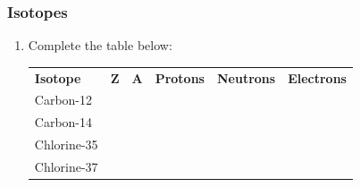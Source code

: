             \subsubsection{  Isotopes }
            \nopagebreak
        \label{m38753*id25862299}\begin{enumerate}[noitemsep, label=\textbf{\arabic*}. ] 
            \label{m38753*uid619}\item Complete the table below:
          \begin{table}[H]
        \begin{center}
      \label{m38753*id25871115}
    \noindent
      \tablelasttail{}
      \begin{xtabular}[t]{|l|l|l|l|l|l|}\hline
        \textbf{Isotope} &
        \textbf{Z} &
        \textbf{A} &
        \textbf{Protons} &
        \textbf{Neutrons} &
        \textbf{Electrons}%
     \tabularnewline{}
        Carbon-12 &
         &
         &
         &
         &
     \tabularnewline{}
        Carbon-14 &
         &
         &
         &
         &
     \tabularnewline{}
        Chlorine-35 &
         &
         &
         &
         &
     \tabularnewline{}
        Chlorine-37 &
         &
         &
         &
         &
     \tabularnewline{}
    \end{xtabular}
      \end{center}

\end{table}
\end{enumerate}
